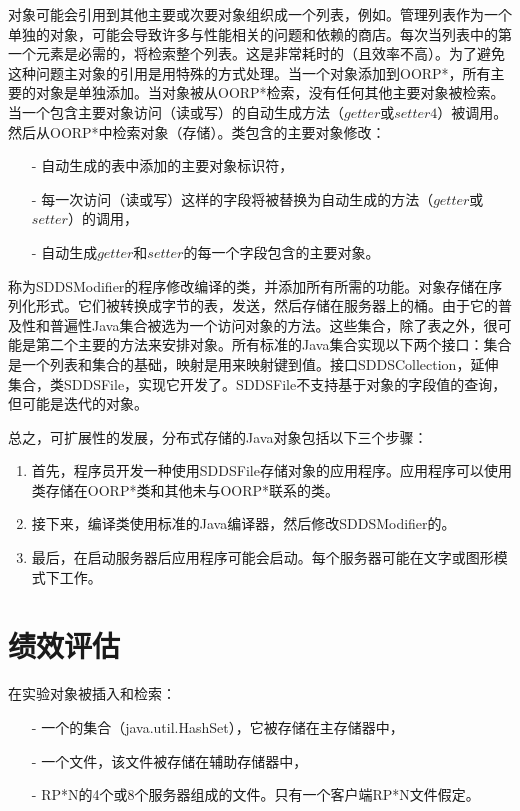 \documentclass[10pt,a4paper]{article}
\begin{document}
\begin{CJK*}{UTF8}{gkai}
对象可能会引用到其他主要或次要对象组织成一个列表，例如。管理列表作为一个单独的对象，可能会导致许多与性能相关的问题和依赖的商店。每次当列表中的第一个元素是必需的，将检索整个列表。这是非常耗时的（且效率不高）。为了避免这种问题主对象的引用是用特殊的方式处理。当一个对象添加到OORP*，所有主要的对象是单独添加。当对象被从OORP*检索，没有任何其他主要对象被检索。 当一个包含主要对象访问（读或写）的自动生成方法（$getter$或$setter4$）被调用。然后从OORP*中检索对象（存储）。类包含的主要对象修改：
\begin{itemize}
\item[-] 自动生成的表中添加的主要对象标识符，
\item[-] 每一次访问（读或写）这样的字段将被替换为自动生成的方法（$getter$或$setter$）的调用，
\item[-] 自动生成$getter$和$setter$的每一个字段包含的主要对象。
\end{itemize}


称为SDDSModifier的程序修改编译的类，并添加所有所需的功能。对象存储在序列化形式。它们被转换成字节的表，发送，然后存储在服务器上的桶。由于它的普及性和普遍性Java集合被选为一个访问对象的方法。这些集合，除了表之外，很可能是第二个主要的方法来安排对象。所有标准的Java集合实现以下两个接口：集合是一个列表和集合的基础，映射是用来映射键到值。接口SDDSCollection，延伸集合，类SDDSFile，实现它开发了。SDDSFile不支持基于对象的字段值的查询，但可能是迭代的对象。


总之，可扩展性的发展，分布式存储的Java对象包括以下三个步骤：
\begin{enumerate}
\item 首先，程序员开发一种使用SDDSFile存储对象的应用程序。应用程序可以使用类存储在OORP*类和其他未与OORP*联系的类。
\item 接下来，编译类使用标准的Java编译器，然后修改SDDSModifier的。
\item 最后，在启动服务器后应用程序可能会启动。每个服务器可能在文字或图形模式下工作。
\end{enumerate}


\section{绩效评估}
在实验对象被插入和检索：
\begin{itemize}
\item[-] 一个的集合（java.util.HashSet），它被存储在主存储器中，
\item[-] 一个文件，该文件被存储在辅助存储器中，
\item[-] RP*N的4个或8个服务器组成的文件。只有一个客户端RP*N文件假定。
\end{itemize}



\end{CJK*}
\end{document}
